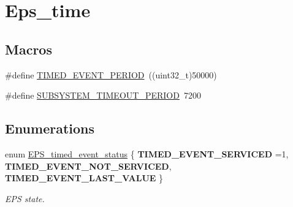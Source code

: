 \hypertarget{group__eps__time}{\section{Eps\-\_\-time}
\label{group__eps__time}
}
\subsection*{Macros}
\begin{DoxyCompactItemize}
\item 
\#define \hyperlink{group__eps__time_gaf4da2404e3a3fe43521faf49858c18f9}{T\-I\-M\-E\-D\-\_\-\-E\-V\-E\-N\-T\-\_\-\-P\-E\-R\-I\-O\-D}~((uint32\-\_\-t)50000)
\item 
\#define \hyperlink{group__eps__time_gaee54153b451669a5916ee8f65276356b}{S\-U\-B\-S\-Y\-S\-T\-E\-M\-\_\-\-T\-I\-M\-E\-O\-U\-T\-\_\-\-P\-E\-R\-I\-O\-D}~7200
\end{DoxyCompactItemize}
\subsection*{Enumerations}
\begin{DoxyCompactItemize}
\item 
enum \hyperlink{group__eps__time_ga8a08e679766a496bf509cdc16a4041d9}{E\-P\-S\-\_\-timed\-\_\-event\-\_\-status} \{ {\bfseries T\-I\-M\-E\-D\-\_\-\-E\-V\-E\-N\-T\-\_\-\-S\-E\-R\-V\-I\-C\-E\-D} =1, 
{\bfseries T\-I\-M\-E\-D\-\_\-\-E\-V\-E\-N\-T\-\_\-\-N\-O\-T\-\_\-\-S\-E\-R\-V\-I\-C\-E\-D}, 
{\bfseries T\-I\-M\-E\-D\-\_\-\-E\-V\-E\-N\-T\-\_\-\-L\-A\-S\-T\-\_\-\-V\-A\-L\-U\-E}
 \}
\begin{DoxyCompactList}\small\item\em E\-P\-S state. \end{DoxyCompactList}\end{DoxyCompactItemize}
